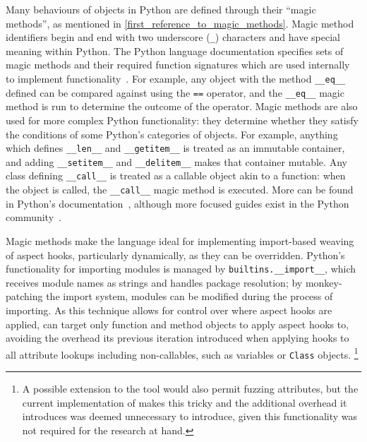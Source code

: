 Many behaviours of objects in Python are defined through their ``magic
methods'', as mentioned in \cref{first_reference_to_magic_methods}. Magic method
identifiers begin and end with two underscore (\lstinline{_}) characters and
have special meaning within Python. The Python language documentation specifies
sets of magic methods and their required function signatures which are used
internally to implement functionality~\cite{py3docs}. For example, any object
with the method \lstinline{__eq__} defined can be compared against using the
\lstinline{==} operator, and the \lstinline{__eq__} magic method is run to
determine the outcome of the operator. Magic methods are also used for more
complex Python functionality: they determine whether they satisfy the conditions
of some Python's categories of objects. For example, anything which defines
\lstinline{__len__} and \lstinline{__getitem__} is treated as an immutable
container, and adding \lstinline{__setitem__} and \lstinline{__delitem__} makes
that container mutable. Any class defining \lstinline{__call__} is treated as a
callable object akin to a function: when the object is called, the
\lstinline{__call__} magic method is executed. More can be found in Python's
documentation~\cite{py3docs}, although more focused guides exist in the Python
community~\cite{magicmethodguide}.

Magic methods make the language ideal for implementing import-based weaving of
aspect hooks, particularly dynamically, as they can be overridden. Python's
functionality for importing modules is managed by
\lstinline{builtins.__import__}, which receives module names as strings and
handles package resolution; by monkey-patching the import system, modules can be
modified during the process of importing. As this technique allows for control
over where aspect hooks are applied, \pdsf can target only function and method
objects to apply aspect hooks to, avoiding the overhead its previous iteration
introduced when applying hooks to all attribute lookups including non-callables,
such as variables or \lstinline{Class} objects.
\footnote{
  A possible extension to the tool would also permit fuzzing attributes, but the
  current implementation of \pdsf{} makes this tricky and the additional
  overhead it introduces was deemed unnecessary to introduce, given this
  functionality was not required for the research at hand.
}

